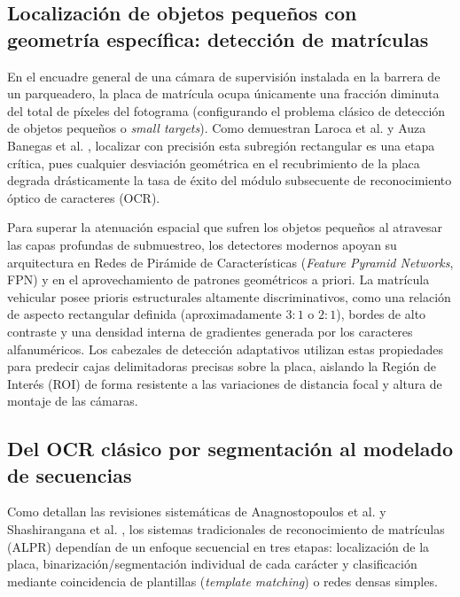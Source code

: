 \subsection{Localización de objetos pequeños con geometría específica: detección
de matrículas}

En el encuadre general de una cámara de supervisión instalada en la barrera de
un parqueadero, la placa de matrícula ocupa únicamente una fracción diminuta del
total de píxeles del fotograma (configurando el problema clásico de detección de
objetos pequeños o \textit{small targets}). Como demuestran Laroca et al.
\cite{laroca2018robust} y Auza Banegas et al. \cite{auzabanegas2026blpr},
localizar con precisión esta subregión rectangular es una etapa crítica, pues
cualquier desviación geométrica en el recubrimiento de la placa degrada
drásticamente la tasa de éxito del módulo subsecuente de reconocimiento óptico
de caracteres (OCR).

Para superar la atenuación espacial que sufren los objetos pequeños al atravesar
las capas profundas de submuestreo, los detectores modernos apoyan su
arquitectura en Redes de Pirámide de Características (\textit{Feature Pyramid
Networks}, FPN) \cite{lin2017fpn} y en el aprovechamiento de patrones geométricos a priori. La
matrícula vehicular posee prioris estructurales altamente discriminativos, como
una relación de aspecto rectangular definida (aproximadamente $3:1$ o $2:1$),
bordes de alto contraste y una densidad interna de gradientes generada por los
caracteres alfanuméricos. Los cabezales de detección adaptativos utilizan estas
propiedades para predecir cajas delimitadoras precisas sobre la placa, aislando
la Región de Interés (ROI) de forma resistente a las variaciones de distancia
focal y altura de montaje de las cámaras.

\subsection{Del OCR clásico por segmentación al modelado de secuencias}

Como detallan las revisiones sistemáticas de Anagnostopoulos et al.
\cite{anagnostopoulos2008lpr} y Shashirangana et al. \cite{shashirangana2021alpr},
los sistemas tradicionales de reconocimiento de matrículas (ALPR) dependían de
un enfoque secuencial en tres etapas: localización de la placa, 
binarización/segmentación individual de cada carácter y clasificación mediante
coincidencia de plantillas (\textit{template matching}) o redes densas simples. 

